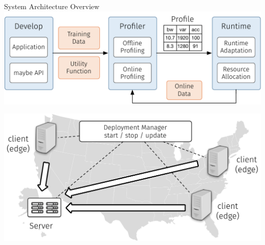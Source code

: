 \begin{frame}{System Architecture Overview}
  \centering
  \includegraphics[width=0.8\linewidth]{figures/arch.pdf}\\
  \centering
  \includegraphics[width=0.7\linewidth]{figures/arch-2.pdf}
\end{frame}

